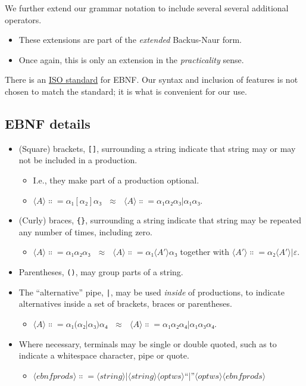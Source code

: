 \documentclass[11pt]{article}
\theoremstyle{definition}
\begin{document}
We further extend our grammar notation to include several
several additional operators.
\begin{itemize}
\item These extensions are part of the \emph{extended} Backus-Naur form.
\item Once again, this is only an extension in the \emph{practicality} sense.
\end{itemize}

There is an \href{https://www.iso.org/standard/26153.html}{ISO standard} for EBNF.
Our syntax and inclusion of features is
not chosen to match the standard;
it is what is convenient for our use.

\subsection{EBNF details}
\label{sec:org4ff9c65}

\begin{itemize}
\item (Square) brackets, \texttt{[]}, surrounding a string
indicate that string may or may not be included in a production.
\begin{itemize}
\item I.e., they make part of a production optional.
\item \(⟨A⟩ ∷= α₁ [ α₂ ] α₃ \ \ \ ≈ \ \ \ ⟨A⟩ ∷= α₁ α₂ α₃ | α₁ α₃\).
\end{itemize}
\item (Curly) braces, \texttt{\{\}}, surrounding a string
indicate that string may be repeated any number of times,
including zero.
\begin{itemize}
\item \(⟨A⟩ ∷= α₁ { α₂ } α₃ \ \ \ ≈ \ \ \ ⟨A⟩ ∷= α₁ ⟨A′⟩ α₃\) together
with \(⟨A′⟩ ∷= α₂ ⟨A′⟩ | ε\).
\end{itemize}
\item Parentheses, \texttt{()}, may group parts of a string.
\item The “alternative” pipe, \texttt{|}, may be used \emph{inside} of productions,
to indicate alternatives inside a set of brackets, braces
or parentheses.
\begin{itemize}
\item \(⟨A⟩ ∷= α₁ (α₂ | α₃) α₄ \ \ \ ≈ \ \ \ ⟨A⟩ ∷= α₁ α₂ α₄ | α₁ α₃ α₄\).
\end{itemize}
\item Where necessary, terminals may be single or double quoted,
such as to indicate a whitespace character, pipe or quote.
\begin{itemize}
\item \(⟨ebnfprods⟩ ∷= ⟨string⟩ | ⟨string⟩ ⟨optws⟩ “|” ⟨optws⟩ ⟨ebnfprods⟩\)
\end{itemize}
\end{itemize}
\end{document}
